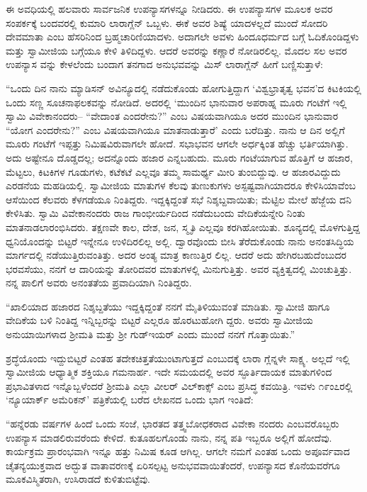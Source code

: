 ಈ ಅವಧಿಯಲ್ಲಿ ಹಲವಾರು ಸಾರ್ವಜನಿಕ ಉಪನ್ಯಾಸಗಳನ್ನೂ ನೀಡಿದರು. ಈ ಉಪನ್ಯಾಸಗಳ ಮೂಲಕ ಅವರ ಸಂಪರ್ಕಕ್ಕೆ ಬಂದವರಲ್ಲಿ ಕುಮಾರಿ ಲಾರಾಗ್ಲೆನ್ ಒಬ್ಬಳು. ಈಕೆ ಅವರ ಶಿಷ್ಯೆ ಯಾದಳಲ್ಲದೆ ಮುಂದೆ ಸೋದರಿ ದೇವಮಾತಾ ಎಂಬ ಹೆಸರಿನಿಂದ ಬ್ರಹ್ಮಚಾರಿಣಿಯಾದಳು. ಅದಾಗಲೇ ಅವಳು ಹಿಂದೂಧರ್ಮದ ಬಗ್ಗೆ ಓದಿಕೊಂಡಿದ್ದಳು ಮತ್ತು ಸ್ವಾಮೀಜಿಯ ಬಗ್ಗೆಯೂ ಕೇಳಿ ತಿಳಿದಿದ್ದಳು. ಆದರೆ ಅವರನ್ನು ಕಣ್ಣಾರೆ ನೋಡಿರಲಿಲ್ಲ. ಮೊದಲ ಸಲ ಅವರ ಉಪನ್ಯಾಸ ವನ್ನು ಕೇಳಲೆಂದು ಬಂದಾಗ ತನಗಾದ ಅನುಭವವನ್ನು ಮಿಸ್ ಲಾರಾಗ್ಲೆನ್ ಹೀಗೆ ಬಣ್ಣಿಸುತ್ತಾಳೆ:

“ಒಂದು ದಿನ ನಾನು ಮ್ಯಾಡಿಸನ್ ಅವಿನ್ಯೂದಲ್ಲಿ ನಡೆದುಕೊಂಡು ಹೋಗುತ್ತಿದ್ದಾಗ ‘ವಿಶ್ವಭ್ರಾತೃತ್ವ ಭವನ’ದ ಕಿಟಕಿಯಲ್ಲಿ ಒಂದು ಸಣ್ಣ ಸೂಚನಾಫಲಕವನ್ನು ನೋಡಿದೆ. ಅದರಲ್ಲಿ ‘ಮುಂದಿನ ಭಾನುವಾರ ಅಪರಾಹ್ನ ಮೂರು ಗಂಟೆಗೆ ಇಲ್ಲಿ ಸ್ವಾಮಿ ವಿವೇಕಾನಂದರು– “ವೇದಾಂತ ಎಂದರೇನು?” ಎಂಬ ವಿಷಯವಾಗಿಯೂ ಅದರ ಮುಂದಿನ ಭಾನುವಾರ “ಯೋಗ ಎಂದರೇನು?” ಎಂಬ ವಿಷಯವಾಗಿಯೂ ಮಾತನಾಡುತ್ತಾರೆ’ ಎಂದು ಬರೆದಿತ್ತು. ನಾನು ಆ ದಿನ ಅಲ್ಲಿಗೆ ಮೂರು ಗಂಟೆಗೆ ಇಪ್ಪತ್ತು ನಿಮಿಷವಿರುವಾಗಲೇ ಹೋದೆ. ಸಭಾಭವನ ಆಗಲೇ ಅರ್ಧಕ್ಕಿಂತ ಹೆಚ್ಚು ಭರ್ತಿಯಾಗಿತ್ತು. ಅದು ಅಷ್ಟೇನೂ ದೊಡ್ಡದಲ್ಲ; ಅದನ್ನೊಂದು ಹಜಾರ ಎನ್ನಬಹುದು. ಮೂರು ಗಂಟೆಯಾಗುವ ಹೊತ್ತಿಗೆ ಆ ಹಜಾರ, ಮೆಟ್ಟಲು, ಕಿಟಕಿಗಳ ಗೂಡುಗಳು, ಕಟೆಕಟೆ ಎಲ್ಲವೂ ತಮ್ಮ ಸಾಮರ್ಥ್ಯ ಮೀರಿ ತುಂಬಿದ್ದುವು. ಆ ಹಜಾರವಿದ್ದುದು ಎರಡನೆಯ ಮಹಡಿಯಲ್ಲಿ. ಸ್ವಾಮೀಜಿಯ ಮಾತುಗಳ ಕೆಲವು ತುಣುಕುಗಳು ಅಸ್ಪಷ್ಟವಾಗಿಯಾದರೂ ಕೇಳಿಸಿಯಾವೆಂಬ ಆಸೆಯಿಂದ ಕೆಲವರು ಕೆಳಗಡೆಯೂ ನಿಂತಿದ್ದರು. ಇದ್ದಕ್ಕಿದ್ದಂತೆ ಸಭೆ ನಿಶ್ಶಬ್ದವಾಯಿತು; ಮೆಟ್ಟಿಲ ಮೇಲೆ ಹೆಜ್ಜೆಯ ದನಿ ಕೇಳಿಸಿತು. ಸ್ವಾಮಿ ವಿವೇಕಾನಂದರು ರಾಜ ಗಾಂಭೀರ್ಯದಿಂದ ನಡೆದುಬಂದು ವೇದಿಕೆಯನ್ನೇರಿ ನಿಂತು ಮಾತನಾಡಲಾರಂಭಿಸಿದರು. ತಕ್ಷಣವೇ ಕಾಲ, ದೇಶ, ಜನ, ಸ್ಮೃತಿ ಎಲ್ಲವೂ ಕರಗಿಹೋಯಿತು. ಶೂನ್ಯದಲ್ಲಿ ಮೊಳಗುತ್ತಿದ್ದ ಧ್ವನಿಯೊಂದನ್ನು ಬಿಟ್ಟರೆ ಇನ್ನೇನೂ ಉಳಿದಿರಲಿಲ್ಲ ಅಲ್ಲಿ. ದ್ವಾರವೊಂದು ಬೀಸಿ ತೆರೆದುಕೊಂಡು ನಾನು ಅನಂತಸಿದ್ಧಿಯ ಮಾರ್ಗದಲ್ಲಿ ನಡೆಯುತ್ತಿರುವಂತಿತ್ತು. ಅದರ ಅಂತ್ಯ ಮಾತ್ರ ಕಾಣುತ್ತಿರ ಲಿಲ್ಲ. ಆದರೆ ಅದು ಹೇಗಿರಬಹುದೆಂಬುದರ ಭರವಸೆಯು, ನನಗೆ ಆ ದಾರಿಯನ್ನು ತೋರಿದವರ ಮಾತುಗಳಲ್ಲಿ ಮಿನುಗುತ್ತಿತ್ತು. ಅವರ ವ್ಯಕ್ತಿತ್ವದಲ್ಲಿ ಮಿಂಚುತ್ತಿತ್ತು. ನನ್ನ ಪಾಲಿಗೆ ಅವರು ಅನಂತತೆಯ ಪ್ರವಾದಿಯಾಗಿ ನಿಂತಿದ್ದರು.

“ಖಾಲಿಯಾದ ಹಜಾರದ ನಿಶ್ಶಬ್ದತೆಯು ಇದ್ದಕ್ಕಿದ್ದಂತೆ ನನಗೆ ಮೈತಿಳಿಯುವಂತೆ ಮಾಡಿತು. ಸ್ವಾಮೀಜಿ ಹಾಗೂ ವೇದಿಕೆಯ ಬಳಿ ನಿಂತಿದ್ದ ಇನ್ನಿಬ್ಬರನ್ನು ಬಿಟ್ಟರೆ ಎಲ್ಲರೂ ಹೊರಟುಹೋಗಿ ದ್ದರು. ಅವರು ಸ್ವಾಮೀಜಿಯ ಅನುಯಾಯಿಗಳಾದ ಶ್ರೀಮತಿ ಮತ್ತು ಶ್ರೀ ಗುಡ್​ಇಯರ್ ಎಂದು ಮುಂದೆ ನನಗೆ ಗೊತ್ತಾಯಿತು.”

ಶ್ರದ್ಧೆಯೊಂದು ಇದ್ದುಬಿಟ್ಟರೆ ಎಂತಹ ತದೇಕಚಿತ್ತತೆಯುಂಟಾಗುತ್ತದೆ ಎಂಬುದಕ್ಕೆ ಲಾರಾ ಗ್ಲೆನ್ನಳೇ ಸಾಕ್ಷ್ಯ. ಅಲ್ಲದೆ ಇಲ್ಲಿ ಸ್ವಾಮೀಜಿಯ ಆಧ್ಯಾತ್ಮಿಕ ಶಕ್ತಿಯೂ ಗಮನಾರ್ಹ. ಇದೇ ಸಮಯದಲ್ಲಿ ಅವರ ಸ್ಫೂರ್ತಿದಾಯಕ ಮಾತುಗಳಿಂದ ಪ್ರಭಾವಿತಳಾದ ಇನ್ನೊಬ್ಬಳೆಂದರೆ ಶ್ರೀಮತಿ ಎಲ್ಲಾ ವೀಲರ್ ವಿಲ್​ಕಾಕ್ಸ್ ಎಂಬ ಪ್ರಸಿದ್ಧ ಕವಯಿತ್ರಿ. ಇವಳು ೧೯ಂ೭ರಲ್ಲಿ ‘ನ್ಯೂಯಾರ್ಕ್ ಅಮೆರಿಕನ್​’ ಪತ್ರಿಕೆಯಲ್ಲಿ ಬರೆದ ಲೇಖನದ ಒಂದು ಭಾಗ ಇಂತಿದೆ:

“ಹನ್ನೆರಡು ವರ್ಷಗಳ ಹಿಂದೆ ಒಂದು ಸಂಜೆ, ಭಾರತದ ತತ್ತ್ವಬೋಧಕರಾದ ವಿವೇಕಾ ನಂದರು ಎಂಬವರೊಬ್ಬರು ಉಪನ್ಯಾಸ ಮಾಡಲಿರುವರೆಂದು ಕೇಳಿದೆ. ಕುತೂಹಲಗೊಂಡು ನಾನು, ನನ್ನ ಪತಿ ಇಬ್ಬರೂ ಅಲ್ಲಿಗೆ ಹೋದೆವು. ಕಾರ್ಯಕ್ರಮ ಪ್ರಾರಂಭವಾಗಿ ಇನ್ನೂ ಹತ್ತು ನಿಮಿಷ ಕೂಡ ಆಗಿಲ್ಲ. ಆಗಲೇ ನಮಗೆ ಎಂತಹ ಒಂದು ಅಪೂರ್ವವಾದ ಚೈತನ್ಯಯುಕ್ತವಾದ ಅದ್ಭುತ ವಾತಾವರಣಕ್ಕೆ ಏರಿಸಲ್ಪಟ್ಟ ಅನುಭವವಾಯಿತೆಂದರೆ, ಉಪನ್ಯಾಸದ ಕೊನೆಯವರೆಗೂ ಮೂಕವಿಸ್ಮಿತರಾಗಿ, ಉಸಿರಾಡದೆ ಕುಳಿತುಬಿಟ್ಟೆವು.

